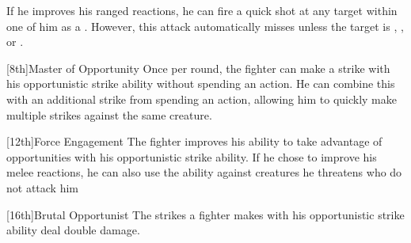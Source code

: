        If he improves his ranged reactions, he can fire a quick shot at any target within one  of him as a .
        However, this attack automatically misses unless the target is , \helpless, or \unaware.

        [8th]{Master of Opportunity}
        Once per round, the fighter can make a strike with his opportunistic strike ability without spending an action.
        He can combine this with an additional strike from spending an action, allowing him to quickly make multiple strikes against the same creature.

        [12th]{Force Engagement}
        The fighter improves his ability to take advantage of opportunities with his opportunistic strike ability.
        If he chose to improve his melee reactions, he can also use the ability against creatures he threatens who do not attack him 

        [16th]{Brutal Opportunist}
        The strikes a fighter makes with his opportunistic strike ability deal double damage.
